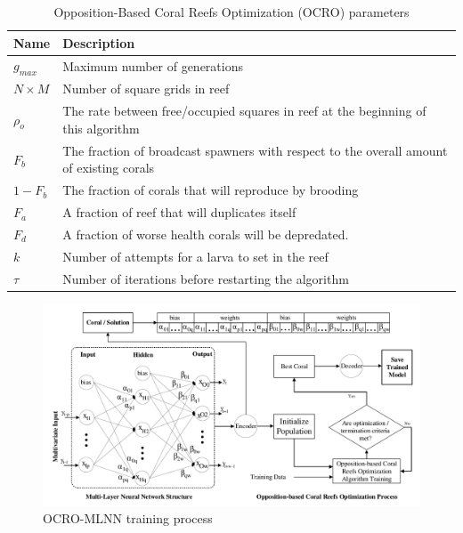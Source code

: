 \documentclass[11pt,twoside]{article}
\begin{document}
\begin{multicols}{2}
\begin{table}[!t]
\begin{center}
\begin{tabular}{ C{1.5cm}| L{14cm}  } 
\textbf{Name} & \textbf{Description} \\ 		\hline
$g_{max}$ 	& Maximum number of generations \\ 	%
$N \times M$ 	& Number of square grids in reef \\ 		%
$\rho_{o}$ 	& The rate between free/occupied squares in reef at the beginning of this algorithm \\ 		%
$F_{b}$ 		& The fraction of broadcast spawners with respect to the overall amount of existing corals \\ 	%
$1 - F_{b}$ 	& The fraction of corals that will reproduce by brooding \\ 	%
$F_{a}$ 		& A fraction of reef that will duplicates itself \\ 				%
$F_{d}$ 		& A fraction of worse health corals will be depredated.  \\ 		%
$k$ 			& Number of attempts for a larva to set in the reef \\ 				%
$\tau$ 		& Number of iterations before restarting the algorithm \\ 					%
\end{tabular}
\end{center}
\caption{Opposition-Based Coral Reefs Optimization (OCRO) parameters}
\label{table:ocro_paras}
\end{table}

\begin{figure}[!t]
	\begin{center}
		\includegraphics[width=1.0\textwidth =0cm 0cm 0cm 0cm, clip]{images/pdf/system/cro_training_final.pdf}
		\caption{OCRO-MLNN training process}
		\label{fig_ocro_training}
	\end{center}
\end{figure}


\end{multicols}
\end{document}
